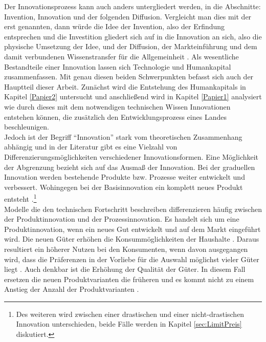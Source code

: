 Der Innovationsprozess kann auch anders untergliedert werden, in die Abschnitte: Invention, Innovation und der folgenden Diffusion. Vergleicht man dies mit der erst genannten, dann würde die Idee der Invention, also der Erfindung entsprechen und die Investition gliedert sich auf in die Innovation an sich, also die physische Umsetzung der Idee, und der Diffusion, der Markteinführung und dem damit verbundenen Wissenstransfer für die Allgemeinheit \citep{Jones.2005}.\newline 
Als wesentliche Bestandteile einer Innovation lassen sich Technologie und Humankapital zusammenfassen. Mit genau diesen beiden Schwerpunkten befasst sich auch der Hauptteil dieser Arbeit. Zunächst wird die Entstehung des Humankapitals in Kapitel \ref{Papier2} untersucht und anschlie{\ss}end wird in Kapitel \ref{Papier1} analysiert wie durch dieses mit dem notwendigen technischen Wissen Innovationen entstehen können, die zusätzlich den Entwicklungsprozess eines Landes beschleunigen.\\


Jedoch ist der Begriff "`Innovation"' stark vom theoretischen Zusammenhang abhängig und in der Literatur gibt es eine Vielzahl von Differenzierungsmöglichkeiten verschiedener Innovationsformen. Eine Möglichkeit der Abgrenzung bezieht sich auf das Ausma{\ss} der Innovation. Bei der graduellen Innovation werden bestehende Produkte bzw. Prozesse weiter entwickelt und verbessert. Wohingegen bei der Basisinnovation ein komplett neues Produkt entsteht \citep{Schebesch.1992}.\footnote{Des weiteren wird zwischen einer drastischen und einer nicht-drastischen Innovation unterschieden, beide Fälle werden in Kapitel \ref{sec:LimitPreis} diskutiert.}\\


Modelle die den technischen Fortschritt beschreiben differenzieren h{\"a}ufig zwischen der Produktinnovation und der Prozessinnovation. Es handelt sich um eine Produktinnovation, wenn ein neues Gut entwickelt und auf dem Markt eingef{\"u}hrt wird.  Die neuen G{\"u}ter erhöhen die Konsumm{\"o}glichkeiten der Haushalte \citep{Grossman.1991a,Grossman.1990b}. Daraus resultiert ein h{\"o}herer Nutzen bei den Konsumenten, wenn davon ausgegangen wird, dass die Pr{\"a}ferenzen in der Vorliebe f{\"u}r die Auswahl m{\"o}glichst vieler G{\"u}ter liegt \citep{Krugman.79}. Auch denkbar ist die Erh{\"o}hung der Qualit{\"a}t der G{\"u}ter. In diesem Fall ersetzen die neuen Produktvarianten die fr{\"u}heren und es kommt nicht zu einem Anstieg der Anzahl der Produktvarianten \citep{Acemoglu.2009}. \\ 


